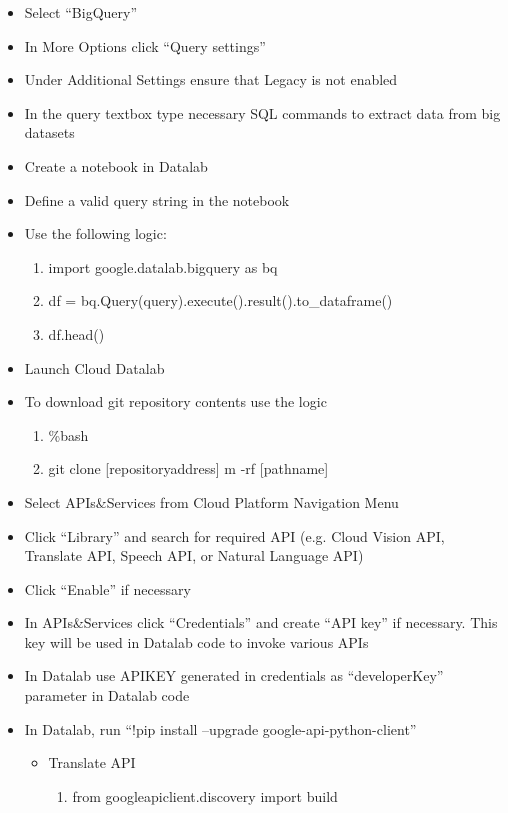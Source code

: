 \documentclass[12pt]{article}
\begin{document}
\begin{itemize}
  \item Select ``BigQuery''
  \item In More Options click ``Query settings''
  \item Under Additional Settings ensure that Legacy is not enabled
  \item In the query textbox type necessary SQL commands to extract data from big datasets
  \item Create a notebook in Datalab
  \item Define a valid query string in the notebook
  \item Use the following logic:
  \begin{enumerate}
    \item import google.datalab.bigquery as bq
    \item df = bq.Query(query).execute().result().to\_dataframe()
    \item df.head()
  \end{enumerate}
\item Launch Cloud Datalab
\item To download git repository contents use the logic
\begin{enumerate}
  \item \%bash
  \item git clone [repositoryaddress] m -rf [pathname]
\end{enumerate}
\item Select APIs\&Services from Cloud Platform Navigation Menu
\item Click ``Library'' and search for required API (e.g. Cloud Vision API, Translate API, Speech API, or Natural Language API)
\item Click ``Enable'' if necessary
\item In APIs\&Services click ``Credentials'' and create ``API key'' if necessary. This key will be used in Datalab code to invoke various APIs
\item In Datalab use APIKEY generated in credentials as ``developerKey'' parameter in Datalab code
\item In Datalab, run
``!pip install --upgrade google-api-python-client''
\begin{itemize}
  \item Translate API
  \begin{enumerate}
    \item from googleapiclient.discovery import build

\end{enumerate}
\end{itemize}
\end{itemize}
\end{document}
